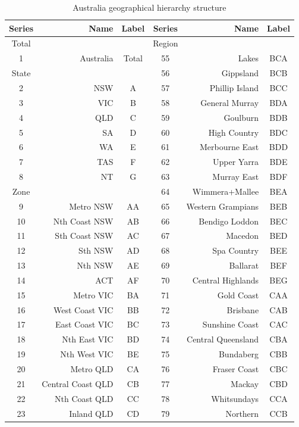 \documentclass[11pt,a4paper,]{article}
\begin{document}
\begin{table}[t]

\caption{\label{tab:Australiageographicaldivision}Australia geographical hierarchy structure}
\centering
\fontsize{9}{11}\selectfont
\begin{tabular}{crccrc}
\toprule
Series & Name & Label & Series & Name & Label\\
\midrule
Total &  &  & Region &  & \\
1 & Australia & Total & 55 & Lakes & BCA\\
State &  &  & 56 & Gippsland & BCB\\
2 & NSW & A & 57 & Phillip Island & BCC\\
3 & VIC & B & 58 & General Murray & BDA\\
4 & QLD & C & 59 & Goulburn & BDB\\
5 & SA & D & 60 & High Country & BDC\\
6 & WA & E & 61 & Merbourne East & BDD\\
7 & TAS & F & 62 & Upper Yarra & BDE\\
8 & NT & G & 63 & Murray East & BDF\\
Zone &  &  & 64 & Wimmera+Mallee & BEA\\
9 & Metro NSW & AA & 65 & Western Grampians & BEB\\
10 & Nth Coast NSW & AB & 66 & Bendigo Loddon & BEC\\
11 & Sth Coast NSW & AC & 67 & Macedon & BED\\
12 & Sth NSW & AD & 68 & Spa Country & BEE\\
13 & Nth NSW & AE & 69 & Ballarat & BEF\\
14 & ACT & AF & 70 & Central Highlands & BEG\\
15 & Metro VIC & BA & 71 & Gold Coast & CAA\\
16 & West Coast VIC & BB & 72 & Brisbane & CAB\\
17 & East Coast VIC & BC & 73 & Sunshine Coast & CAC\\
18 & Nth East VIC & BD & 74 & Central Queensland & CBA\\
19 & Nth West VIC & BE & 75 & Bundaberg & CBB\\
20 & Metro QLD & CA & 76 & Fraser Coast & CBC\\
21 & Central Coast QLD & CB & 77 & Mackay & CBD\\
22 & Nth Coast QLD & CC & 78 & Whitsundays & CCA\\
23 & Inland QLD & CD & 79 & Northern & CCB\\

\end{tabular}
\end{table}
\end{document}
